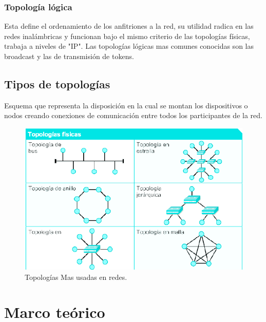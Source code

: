 \documentclass[spanish]{udpreport}
\begin{document}
\subsection{Topología lógica}
Esta define el ordenamiento de los anfitriones a la red, su utilidad radica en las redes inalámbricas y funcionan bajo el mismo criterio de las topologías físicas, trabaja a niveles de "IP". Las topologías lógicas mas comunes conocidas son las broadcast y las de transmisión de tokens.
\section{Tipos de topologías}
Esquema que representa la disposición en la cual se montan  los dispositivos o nodos creando conexiones de comunicación entre todos los participantes de la red.
\\[0.2cm]
\begin{figure}[h]
    \centering
    \includegraphics[scale=0.4]{images/01.png}
    \caption{Topologías Mas usadas en redes.}
    \label{fig:my_label}
\end{figure}
\newpage
\chapter{Marco teórico}
\end{document}
